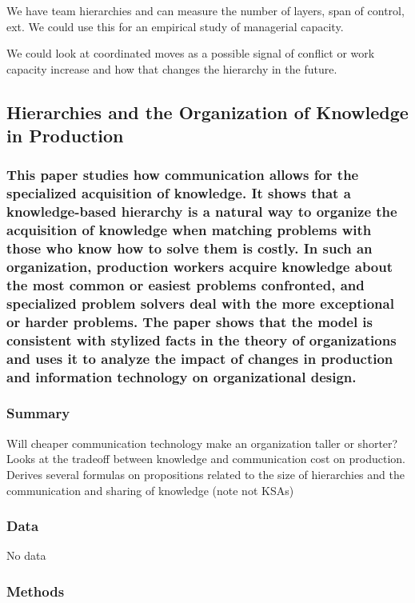 \documentclass[12pt]{article}
\begin{document}
We have team hierarchies and can measure the number of layers, span of control, ext. We could use this for an empirical study of managerial capacity.

We could look at coordinated moves as a possible signal of conflict or work capacity increase and how that changes the hierarchy in the future.


\subsection*{Hierarchies and the Organization of Knowledge in Production\cite{hierarchies_and_the_organization}}

\subsubsection*{This paper studies how communication allows for the specialized acquisition of knowledge. It shows that a knowledge-based hierarchy is a natural way to organize the acquisition of knowledge when matching problems with those who know how to solve them is costly. In such an organization, production workers acquire knowledge about the most common or easiest problems confronted, and specialized problem solvers deal with the more exceptional or harder problems. The paper shows that the model is consistent with stylized facts in the theory of organizations and uses it to analyze the impact of changes in production and information technology on organizational design.}

\subsubsection*{Summary}

Will cheaper communication technology make an organization taller or shorter? Looks at the tradeoff between knowledge and communication cost on production. Derives several formulas on propositions related to the size of hierarchies and the communication and sharing of knowledge (note not KSAs)

\subsubsection*{Data}

No data

\subsubsection*{Methods}
\end{document}
